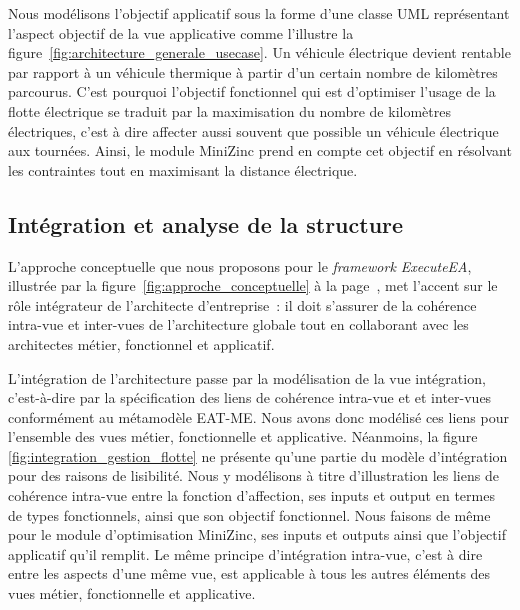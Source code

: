 Nous modélisons l'objectif applicatif sous la forme d'une classe UML
représentant l'aspect objectif de la vue applicative comme l'illustre la
figure~\ref{fig:architecture_generale_usecase}. Un véhicule électrique devient
rentable par rapport à un véhicule thermique à partir d'un certain nombre de
kilomètres parcourus. C'est pourquoi l'objectif fonctionnel qui est d'optimiser
l'usage de la flotte électrique se traduit par la maximisation du nombre de
kilomètres électriques, c'est à dire affecter aussi souvent que possible un
véhicule électrique aux tournées. Ainsi, le module MiniZinc prend en compte cet
objectif en résolvant les contraintes tout en maximisant la distance électrique.



\subsection{Intégration et analyse de la structure}

L'approche conceptuelle que nous proposons pour le \emph{framework ExecuteEA},
illustrée par la figure~\ref{fig:approche_conceptuelle} à la
page~\pageref{fig:approche_conceptuelle}, met l'accent sur le rôle intégrateur
de l'architecte d'entreprise~: il doit s'assurer de la cohérence intra-vue et
inter-vues de l'architecture globale tout en collaborant avec les architectes
métier, fonctionnel et applicatif.

L'intégration de l'architecture passe par la modélisation de la vue intégration,
c'est-à-dire par la spécification des liens de cohérence  intra-vue et et inter-vues conformément au métamodèle EAT-ME. Nous avons donc modélisé ces liens pour
l'ensemble des vues métier, fonctionnelle et applicative. Néanmoins, la figure
\ref{fig:integration_gestion_flotte} ne présente qu'une partie du modèle
d'intégration pour des raisons de lisibilité. Nous y modélisons à titre
d'illustration les liens de cohérence intra-vue entre la fonction d'affection,
ses inputs et output en termes de types fonctionnels, ainsi que son objectif
fonctionnel. Nous faisons de même pour le module d'optimisation MiniZinc, ses
inputs et outputs ainsi que l'objectif applicatif qu'il remplit. Le même
principe d'intégration intra-vue, c'est à dire entre les aspects d'une même vue,
est applicable à tous les autres éléments des vues métier, fonctionnelle et
applicative.

